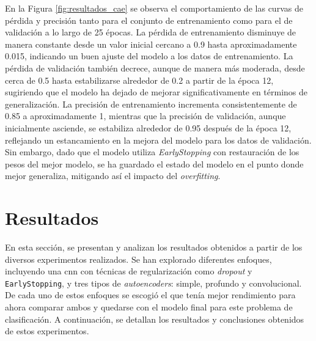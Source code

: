 En la Figura \ref{fig:resultados_cae} se observa el comportamiento de las curvas de pérdida y precisión tanto para el conjunto de entrenamiento como para el de validación a lo largo de 25 épocas. La pérdida de entrenamiento disminuye de manera constante desde un valor inicial cercano a 0.9 hasta aproximadamente 0.015, indicando un buen ajuste del modelo a los datos de entrenamiento. La pérdida de validación también decrece, aunque de manera más moderada, desde cerca de 0.5 hasta estabilizarse alrededor de 0.2 a partir de la época 12, sugiriendo que el modelo ha dejado de mejorar significativamente en términos de generalización. La precisión de entrenamiento incrementa consistentemente de 0.85 a aproximadamente 1, mientras que la precisión de validación, aunque inicialmente asciende, se estabiliza alrededor de 0.95 después de la época 12, reflejando un estancamiento en la mejora del modelo para los datos de validación. Sin embargo, dado que el modelo utiliza \textit{EarlyStopping} con restauración de los pesos del mejor modelo, se ha guardado el estado del modelo en el punto donde mejor generaliza, mitigando así el impacto del \textit{overfitting}.







 

\newpage

\section{Resultados}

En esta sección, se presentan y analizan los resultados obtenidos a partir de los diversos experimentos realizados. Se han explorado diferentes enfoques, incluyendo una \acrshort{cnn} con técnicas de regularización como \textit{dropout} y \lstinline|EarlyStopping|, y tres tipos de \textit{autoencoders}: simple, profundo y convolucional. De cada uno de estos enfoques se escogió el que tenía mejor rendimiento para ahora comparar ambos y quedarse con el modelo final para este problema de clasificación. A continuación, se detallan los resultados y conclusiones obtenidos de estos experimentos.


